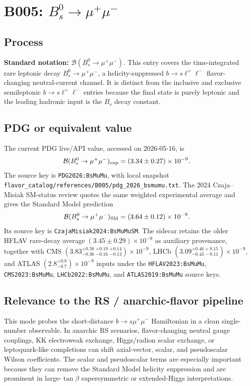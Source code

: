 
\section{B005: \(B_s^0\to\mu^+\mu^-\)}

\subsection*{Process}
\textbf{Standard notation:} \(\mathcal{B}(B_s^0\to\mu^+\mu^-)\).
This entry covers the time-integrated rare leptonic decay \(B_s^0\to\mu^+\mu^-\),
a helicity-suppressed \(b\to s\ell^+\ell^-\) flavor-changing neutral-current
channel.  It is distinct from the inclusive and exclusive semileptonic
\(b\to s\ell^+\ell^-\) entries because the final state is purely leptonic and
the leading hadronic input is the \(B_s\) decay constant.

\subsection*{PDG or equivalent value}
The current PDG live/API value, accessed on 2026-05-16, is
\[
  \mathcal{B}(B_s^0\to\mu^+\mu^-)_{\rm exp}
  = (3.34\pm0.27)\times10^{-9}.
\]
The source key is \texttt{PDG2026:BsMuMu}, with local snapshot
\texttt{flavor\_catalog/references/B005/pdg\_2026\_bsmumu.txt}.  The 2024
Czaja--Misiak SM-status review quotes the same weighted experimental average
and gives the Standard Model prediction
\[
  \mathcal{B}(B_s^0\to\mu^+\mu^-)_{\rm SM}
  = (3.64\pm0.12)\times10^{-9}.
\]
Its source key is \texttt{CzajaMisiak2024:BsMuMuSM}.  The sidecar retains the
older HFLAV rare-decay average \((3.45\pm0.29)\times10^{-9}\) as auxiliary
provenance, together with CMS
\((3.83^{+0.38}_{-0.36}\,{}^{+0.19}_{-0.16}\,{}^{+0.14}_{-0.13})\times10^{-9}\),
LHCb \((3.09^{+0.46+0.15}_{-0.43-0.11})\times10^{-9}\), and ATLAS
\((2.8^{+0.8}_{-0.7})\times10^{-9}\) inputs under the
\texttt{HFLAV2023:BsMuMu}, \texttt{CMS2023:BsMuMu},
\texttt{LHCb2022:BsMuMu}, and \texttt{ATLAS2019:BsMuMu} source keys.

\subsection*{Relevance to the RS / anarchic-flavor pipeline}
This mode probes the short-distance \(b\to s\mu^+\mu^-\) Hamiltonian in a clean
single-number observable.  In anarchic RS scenarios, flavor-changing neutral
gauge couplings, KK electroweak exchange, Higgs/radion scalar exchange, or
leptoquark-like completions can shift axial-vector, scalar, and pseudoscalar
Wilson coefficients.  The scalar and pseudoscalar terms are especially
important because they can remove the Standard Model helicity suppression and
are prominent in large-\(\tan\beta\) supersymmetric or extended-Higgs
interpretations.

